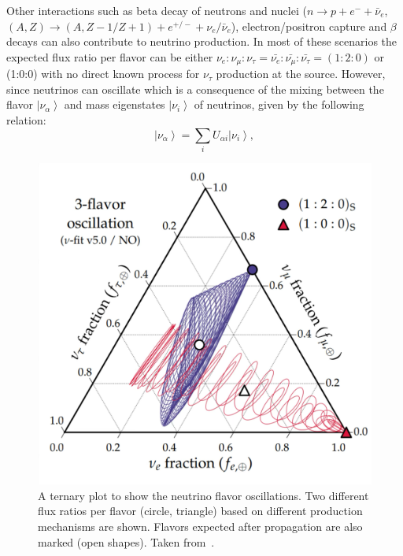 Other interactions such as beta decay of neutrons and nuclei ($n \longrightarrow p + e^- + \bar{\nu}_{e} $, \\$(A, Z) \longrightarrow (A, Z-1/ Z+1) + e^{+/-} + \nu_{e} / \bar{\nu}_{e}$), electron/positron capture and $\beta$ decays can also contribute to neutrino production. In most of these scenarios the expected flux ratio per flavor can be either $ \nu_{e} : \nu_{\mu} : \nu_{\tau} = \bar{\nu_{e}}: \bar{\nu_{\mu}}: \bar{\nu_{\tau}} = (1:2:0) $ or (1:0:0) with no direct known process for $\nu_{\tau}$ production at the source. However, since neutrinos can oscillate which is a consequence of the mixing between the flavor  $\left| \nu_{\alpha} \right\rangle $ and mass eigenstates $\left| \nu_{i} \right\rangle $  of neutrinos, given by the following relation:
\begin{equation}
\left| \nu_{\alpha} \right\rangle  = \sum_i U_{\alpha i} \left| \nu_{i} \right\rangle,
\end{equation}
\begin{figure}[t!]
  \centering
  \includegraphics[width=12.5cm]{thesis_figures/CRnNu/Oscillation_sim_ternary.pdf}
  \caption{A ternary plot to show the neutrino flavor oscillations. Two different flux ratios per flavor (circle, triangle) based on different production mechanisms are shown. Flavors expected after propagation are also marked (open shapes). Taken from~\cite{Ahlers:ISAPP2022}.}
  \label{fig:Oscillation_ternary}
\end{figure}

